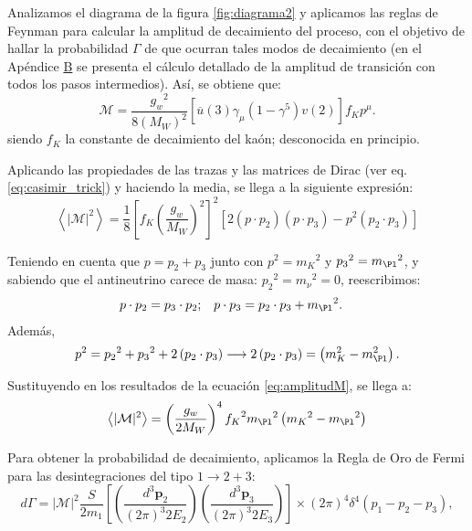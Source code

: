 Analizamos el diagrama de la figura \ref{fig:diagrama2} y aplicamos las reglas de Feynman para calcular la amplitud de decaimiento del proceso, con el objetivo de hallar la probabilidad $\Gamma$ de que ocurran tales modos de decaimiento (en el Apéndice \hyperref[cap:B]{B} se presenta el cálculo detallado de la amplitud de transición con todos los pasos intermedios). Así, se obtiene que:
\begin{equation}
\mathcal{M} =\dfrac{{g_{w}}^2}{8\left( M_W\right)^{2}}\left[ \overline{u}\left(3\right) \gamma_{\mu}\left( 1-\gamma^{5} \right) v\left( 2\right) \right] f_K p^{\mu} .\label{eq:Msimple}
\end{equation}
siendo $f_K$ la constante de decaimiento del kaón; desconocida en principio.

Aplicando las propiedades de las trazas y las matrices de Dirac (ver eq. \ref{eq:casimir_trick}) y haciendo la media, se llega a la siguiente expresión: 
\begin{equation}
\left\langle |\mathcal{M}|^{2}\right\rangle=\dfrac{1}{8}\left[ f_{K}\left( \dfrac{g_w}{M_W}\right) ^{2}\right] ^{2}\left[2\left( p\cdot p_{2}\right) \left( p\cdot p_{3}\right) -p^{2}\left( p_{2}\cdot p_{3}\right)\right]\label{eq:amplitudM}
\end{equation}

Teniendo en cuenta que $p=p_{2}+p_{3}$ junto con $p^2={m_K}^2$ y ${p_3}^2={m_{\Pl}}^2$, y sabiendo que el antineutrino carece de masa: ${p_2}^2={m_{\nu}}^2=0$, reescribimos:
\begin{align}
p\cdot p_{2} &= p_{3} \cdot p_{2}; & p \cdot p_{3} &= p_{2} \cdot p_{3}+{m_{\Pl}}^2.
\end{align}
Además,
\begin{equation}
p^{2}={p_{2}}^{2}+{p_3}^{2}+2\left( p_{2} \cdot p_{3}\right) \longrightarrow 2\left( p_{2} \cdot p_{3}\right)=\left( m_{K}^{2}-m_{\Pl}^{2}\right).
\end{equation}

Sustituyendo en los resultados de la ecuación \ref{eq:amplitudM}, se llega a:
\begin{equation}
\left\langle |\mathcal{M}|^{2}\right\rangle=\left( \dfrac{g_w}{2M_W}\right)^{4} {f_K}^2 {m_{\Pl}}^{2}\left( {m_{K}}^{2}-{m_{\Pl}}^{2}\right)\label{eq:meanamplitude}
\end{equation}

Para obtener la probabilidad de decaimiento, aplicamos la Regla de Oro de Fermi para las desintegraciones del tipo $ 1 \rightarrow 2+3$:
\begin{equation}
d\Gamma =\left| \mathcal{M}\right| ^{2}\dfrac{S}{2m_{1}}\left[ \left( \dfrac{d^{3}\boldsymbol{p}_{2}}{\left( 2\pi \right) ^{3}2E_{2}}\right) \left( \dfrac{d^{3}\boldsymbol{p}_{3}}{\left( 2\pi \right) ^{3}2E_{3}}\right) \right] \times \left( 2\pi \right) ^{4}\delta ^{4}\left( p_{1}-p_{2}-p_{3}\right) ,
\end{equation}

